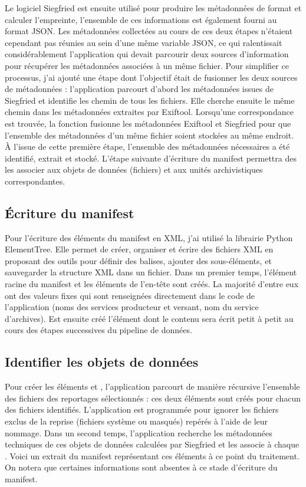 Le logiciel Siegfried est ensuite utilisé pour produire les métadonnées de format et calculer l'empreinte, l'ensemble de ces informations est également fourni au format JSON. Les métadonnées collectées au cours de ces deux étapes n'étaient cependant pas réunies au sein d'une même variable JSON, ce qui ralentissait considérablement l'application qui devait parcourir deux sources d'information pour récupérer les métadonnées associées à un même fichier. Pour simplifier ce processus, j'ai ajouté une étape dont l'objectif était de fusionner les deux sources de métadonnées : l'application parcourt d’abord les métadonnées issues de Siegfried et identifie les chemin de tous les fichiers. Elle cherche ensuite le même chemin dans les métadonnées extraites par Exiftool. Lorsqu’une correspondance est trouvée, la fonction fusionne les métadonnées Exiftool et Siegfried pour que l’ensemble des métadonnées d’un même fichier soient stockées au même endroit.
\\

À l'issue de cette première étape, l'ensemble des métadonnées nécessaires a été identifié, extrait et stocké. L'étape suivante d'écriture du manifest permettra des les associer aux objets de données (fichiers) et aux unités archivistiques correspondantes.

\subsection*{Écriture du manifest}
Pour l'écriture des éléments du manifest en XML, j'ai utilisé la librairie Python ElementTree. Elle permet de créer, organiser et écrire des fichiers XML en proposant des outils pour définir des balises, ajouter des sous-éléments, et sauvegarder la structure XML dans un fichier. Dans un premier temps, l’élément racine du manifest et les éléments de l’en-tête sont créés. La majorité d'entre eux ont des valeurs fixes qui sont renseignées directement dans le code de l'application (noms des services producteur et versant, nom du service d'archives). Est ensuite créé l'élément  dont le contenu sera écrit petit à petit au cours des étapes successives du pipeline de données.
\subsection*{Identifier les objets de données}

Pour créer les éléments  et , l'application parcourt de manière récursive l’ensemble des fichiers des reportages sélectionnés : ces deux éléments sont créés pour chacun des fichiers identifiés. L'application est programmée pour ignorer les fichiers exclus de la reprise (fichiers système ou masqués) repérés à l'aide de leur nommage. Dans un second temps, l'application recherche les métadonnées techniques de ces objets de données calculées par Siegfried et les associe à chaque . Voici un extrait du manifest représentant ces éléments à ce point du traitement. On notera que certaines informations sont absentes à ce stade d'écriture du manifest.

